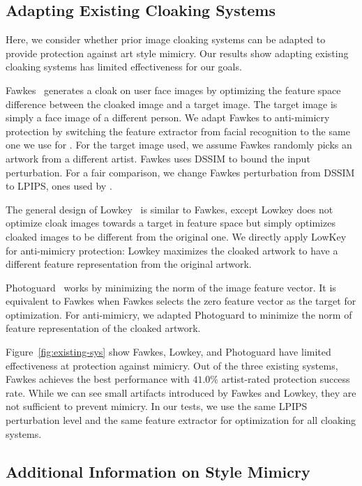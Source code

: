 \subsection{Adapting Existing Cloaking Systems}
\label{app:prior-work}

Here, we consider whether prior image cloaking systems can be adapted to
provide protection against art style mimicry. Our results show adapting
existing cloaking systems has limited effectiveness for our goals.

 Fawkes~\cite{shan2020fawkes}
generates a cloak on user face images by optimizing the feature space
difference between the cloaked image and a target image. The target image is
simply a face image of a different person. We adapt Fawkes to anti-mimicry
protection by switching the feature extractor from facial recognition to the
same one we use for \system. For the target image used, we assume Fawkes
randomly picks an artwork from a different artist. Fawkes uses DSSIM to bound
the input perturbation. For a fair comparison, we change Fawkes perturbation
from DSSIM to LPIPS, ones used by \system.

The general design of Lowkey~\cite{cherepanova2021lowkey} is similar to
Fawkes, except Lowkey does not optimize cloak images towards a target in
feature space but simply optimizes cloaked images to be different from the
original one. We directly apply LowKey for anti-mimicry protection: Lowkey
maximizes the cloaked artwork to have a different feature representation from
the original artwork. 

Photoguard~\cite{madry-defense} works by minimizing the norm of the image
feature vector. It is equivalent to Fawkes when Fawkes selects the zero
feature vector as the target for optimization. For anti-mimicry, we adapted
Photoguard to minimize the norm of feature representation of the cloaked
artwork. 

 Figure~\ref{fig:existing-sys} show Fawkes,
Lowkey, and Photoguard have limited effectiveness at protection against mimicry.
Out of the three existing systems, Fawkes achieves the best
performance with $41.0\%$ artist-rated protection success rate. While we can
see small artifacts introduced by Fawkes and Lowkey, they are not sufficient
to prevent mimicry. In our tests, we use the same LPIPS perturbation level
and the same feature extractor for optimization for all cloaking systems.  

\subsection{Additional Information on Style Mimicry}
\label{app:mimicry}

